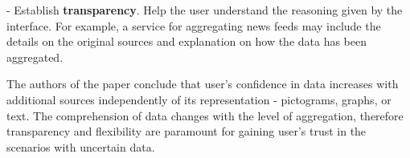 \documentclass[12pt,letterpaper]{article}
\begin{document}
\hspace{10mm} - Establish \textbf{transparency}. Help the user understand the reasoning given by the interface. For example, a service for aggregating news feeds may include the details on the original sources and explanation on how the data has been aggregated. 

The authors of the paper conclude that user's confidence in data increases with additional sources independently of its representation - pictograms, graphs, or text. The comprehension of data changes with the level of aggregation, therefore transparency and flexibility are paramount for gaining user's trust in the scenarios with uncertain data. 

 

\end{document}
